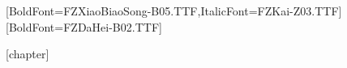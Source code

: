 \usepackage[scheme = plain, linespread = 1.3]{ctex}
[BoldFont={FZXiaoBiaoSong-B05.TTF},ItalicFont={FZKai-Z03.TTF}]
[BoldFont={FZDaHei-B02.TTF}]


\makeatletter
\renewenvironment{proof}[1][\proofname]{\par
	\pushQED{\qed}
	\normalfont \topsep6\p@\@plus6\p@\relax
	\begin{itemize}[
		leftmargin=0em,
		itemindent=2em,
		labelsep=1em,
		listparindent=2em
	]
		\item[\bfseries#1]
}{
	\popQED \end{itemize} \@endpefalse
}
\makeatother

\renewcommand{\proofname}{证}

\newenvironment{solution}{\begin{proof}[解]}{\end{proof}}

\newenvironment{analysis}{\begin{proof}[析]\let\qed\relax}{\end{proof}}

[chapter]

\def\questionautorefname{题}


\renewcommand{\theequation}{\arabic{question}.\arabic{equation}}

\newcommand{\source}[1]{\begin{flushright}(\textit{#1})\end{flushright}}

\theoremstyle{definition}\newtheorem{theorem}{定理}

\theoremstyle{definition}\newtheorem{axiom}[theorem]{公理}

\theoremstyle{definition}\newtheorem{rules}[theorem]{规则}

\theoremstyle{definition}\newtheorem{corollary}[theorem]{推论}